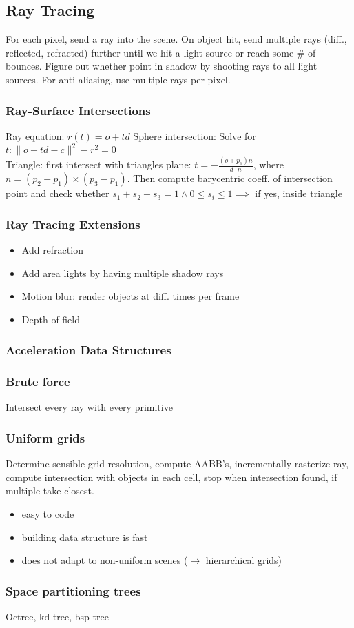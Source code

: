 \documentclass[a4paper,10pt]{article}
\newcommand*\good{\item[\textcolor{goodgreen}{\(\bm{+}\)}]}
\newcommand*\bad{\item[\textcolor{badred}{\(\bm{-}\)}]}
\begin{document}
\subsection{Ray Tracing}
For each pixel, send a ray into the scene. On object hit, send multiple rays (diff., reflected, refracted) further until we hit a light source or reach some \# of bounces. Figure out whether point in shadow by shooting rays to all light sources. For anti-aliasing, use multiple rays per pixel.

\subsubsection{Ray-Surface Intersections} Ray equation: \( r(t) = o + td \)
Sphere intersection: Solve for \( t: \lVert o + td - c \rVert ^2 - r^2 = 0 \) \\
Triangle: first intersect with triangles plane: \( t = -\frac{(o+p_{1})n}{d\cdot n} \), where \( n = (p_{2}-p_{1})\times(p_{3}-p_{1}) \).
Then compute barycentric coeff. of intersection point and check whether \( s_{1}+s_{2}+s_{3} = 1 \land 0 \le s_i \le 1 \implies \) if yes, inside triangle

\subsubsection{Ray Tracing Extensions}
\begin{itemize}
    \item Add refraction
    \item Add area lights by having multiple shadow rays
    \item Motion blur: render objects at diff. times per frame
    \item Depth of field
\end{itemize}

\subsubsection{Acceleration Data Structures}
\smallskip
\subsubsection{Brute force} Intersect every ray with every primitive
\subsubsection{Uniform grids} Determine sensible grid resolution, compute AABB's, incrementally rasterize ray, compute intersection with objects in each cell, stop when intersection found, if multiple take closest.
\begin{itemize}
    \good easy to code
    \good building data structure is fast
    \bad does not adapt to non-uniform scenes (\( \to  \) hierarchical grids)
\end{itemize}
\subsubsection{Space partitioning trees} Octree, kd-tree, bsp-tree
\end{document}
